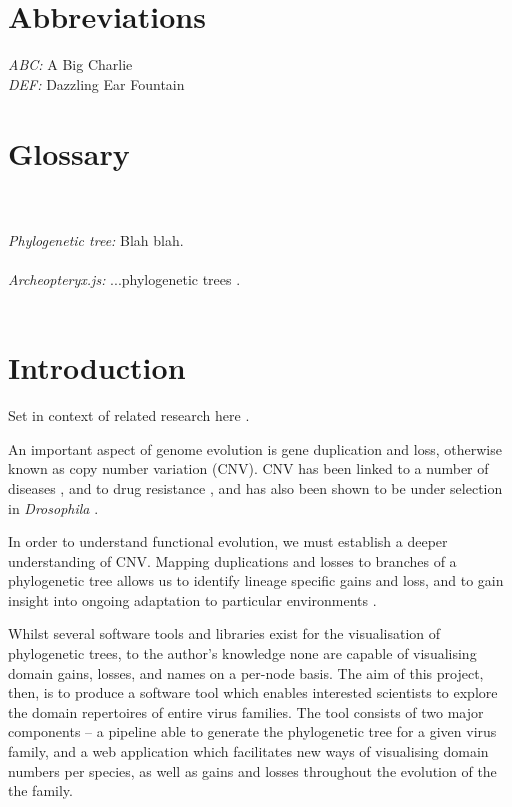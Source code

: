 \documentclass[12pt,a4paper]{article}
\begin{document}
\section*{Abbreviations}
\doublespacing
\textit{ABC:} A Big Charlie\\
\textit{DEF:} Dazzling Ear Fountain\\

\newpage
\section*{Glossary}
\label{sec:glossary}
\doublespacing
{}\\\\
\textit{Phylogenetic tree:} Blah blah.\\\\
\textit{Archeopteryx.js:} ...phylogenetic trees .\\\\

\newpage
\section{Introduction}
Set in context of related research here \citep{Brito2017}.

An important aspect of genome evolution is gene duplication and loss, otherwise known as copy number variation (CNV). CNV has been linked to a number of diseases \citep{lupski2007genomic}, and to drug resistance \citep{nair2008adaptive}, and has also been shown to be under selection in \textit{Drosophila} \citep{emerson2008natural}.

In order to understand functional evolution, we must establish a deeper understanding of CNV. Mapping duplications and losses to branches of a phylogenetic tree allows us to identify lineage specific gains and loss, and to gain insight into ongoing adaptation to particular environments \citep{ames2010gene,Ames2012}.

Whilst several software tools and libraries exist for the visualisation of phylogenetic trees, to the author's knowledge none are capable of visualising domain gains, losses, and names on a per-node basis. The aim of this project, then, is to produce a software tool which enables interested scientists to explore the domain repertoires of entire virus families. The tool consists of two major components -- a pipeline able to generate the phylogenetic tree for a given virus family, and a web application which facilitates new ways of visualising domain numbers per species, as well as gains and losses throughout the evolution of the the family.\\
\end{document}
